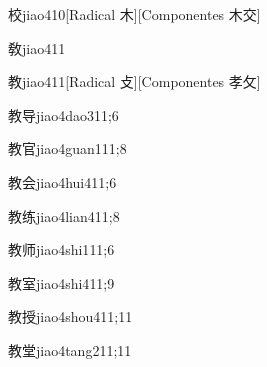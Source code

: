 \begin{verbete}{校}{jiao4}{10}[Radical 木][Componentes 木交]
\end{verbete}

\begin{verbete}{敎}{jiao4}{11}
\end{verbete}

\begin{verbete}{教}{jiao4}{11}[Radical 攴][Componentes 孝⺙]
\end{verbete}

\begin{verbete}{教导}{jiao4dao3}{11;6}
\end{verbete}

\begin{verbete}{教官}{jiao4guan1}{11;8}
\end{verbete}

\begin{verbete}{教会}{jiao4hui4}{11;6}
\end{verbete}

\begin{verbete}{教练}{jiao4lian4}{11;8}
\end{verbete}

\begin{verbete}{教师}{jiao4shi1}{11;6}
\end{verbete}

\begin{verbete}{教室}{jiao4shi4}{11;9}
\end{verbete}

\begin{verbete}{教授}{jiao4shou4}{11;11}
\end{verbete}

\begin{verbete}{教堂}{jiao4tang2}{11;11}
\end{verbete}

